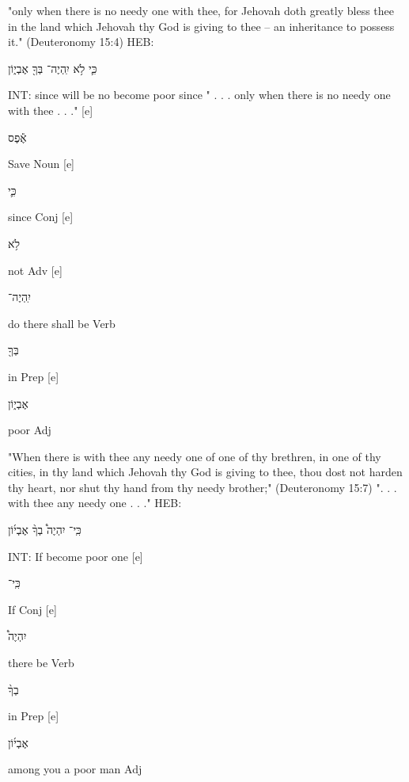 \documentclass[11pt]{article}
\begin{document}
"only when there is no needy one with thee, for Jehovah doth greatly bless thee in the land which Jehovah thy God is giving to thee -- an inheritance to possess it."\newline
(Deuteronomy 15:4)\newline
HEB:\begin{hebrew} כִּ֛י לֹ֥א יִֽהְיֶה־ בְּךָ֖ אֶבְי֑וֹן \end{hebrew}\newline
INT: since will be no become poor since\newline
" . . . only when there is no needy one with thee . . ." [e]	%
\begin{hebrew}אֶ֕פֶס\end{hebrew}	Save	Noun [e]%
\begin{hebrew}	כִּ֛י	\end{hebrew}since	Conj [e]%
\begin{hebrew}לֹ֥א	\end{hebrew}not	Adv [e]%
\begin{hebrew}יִֽהְיֶה־	\end{hebrew}do there shall be	Verb\newline
\phantom{1961 [e]	} \begin{hebrew}בְּךָ֖	\end{hebrew}in	Prep [e]%
\begin{hebrew} אֶבְי֑וֹן \end{hebrew}	poor	Adj\newline


"When there is with thee any needy one of one of thy brethren, in one of thy cities, in thy land which Jehovah thy God is giving to thee, thou dost not harden thy heart, nor shut thy hand from thy needy brother;"\newline
(Deuteronomy 15:7)\newline
". . . with thee any needy one . . ."
HEB:\begin{hebrew} כִּֽי־ יִהְיֶה֩ בְךָ֨ אֶבְי֜וֹן\end{hebrew}\newline
INT: If become poor one [e]%
\begin{hebrew}כִּֽי־	\end{hebrew}If	Conj [e]%
\begin{hebrew}	יִהְיֶה֩	\end{hebrew}there be	Verb\newline
\phantom{1961 [e]	} \begin{hebrew}	בְךָ֨	\end{hebrew}in	Prep [e]%
\begin{hebrew}אֶבְי֜וֹן	\end{hebrew}among you a poor man	Adj\newline
\end{document}
